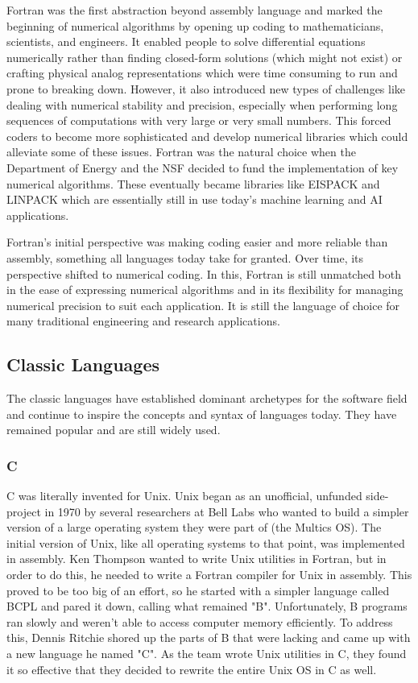 Fortran was the first abstraction beyond assembly language and marked the
beginning of numerical algorithms by opening up coding to mathematicians,
scientists, and engineers. It enabled people to solve differential equations
numerically rather than finding closed-form solutions (which might not exist)
or crafting physical analog representations which were time consuming to run
and prone to breaking down. However, it also introduced new types of challenges
like dealing with numerical stability and precision, especially when performing
long sequences of computations with very large or very small numbers. This
forced coders to become more sophisticated and develop numerical libraries
which could alleviate some of these issues. Fortran was the natural choice when
the Department of Energy and the NSF decided to fund the implementation of key
numerical algorithms. These eventually became libraries like EISPACK and
LINPACK which are essentially still in use today's machine learning and AI
applications.

Fortran's initial perspective was making coding easier and more reliable than
assembly, something all languages today take for granted. Over time, its
perspective shifted to numerical coding. In this, Fortran is still unmatched
both in the ease of expressing numerical algorithms and in its flexibility for
managing numerical precision to suit each application. It is still the language
of choice for many traditional engineering and research applications.

\subsection{Classic Languages}

The classic languages have established dominant archetypes for the software
field and continue to inspire the concepts and syntax of languages today. They
have remained popular and are still widely used.

\subsubsection{C}

C was literally invented for Unix. Unix began as an unofficial, unfunded
side-project in 1970 by several researchers at Bell Labs who wanted to build a
simpler version of a large operating system they were part of (the Multics OS).
The initial version of Unix, like all operating systems to that point, was
implemented in assembly. Ken Thompson wanted to write Unix utilities in
Fortran, but in order to do this, he needed to write a Fortran compiler for
Unix in assembly. This proved to be too big of an effort, so he started with a
simpler language called BCPL and pared it down, calling what remained "B".
Unfortunately, B programs ran slowly and weren't able to access computer memory
efficiently. To address this, Dennis Ritchie shored up the parts of B that were
lacking and came up with a new language he named "C". As the team wrote Unix
utilities in C, they found it so effective that they decided to rewrite the
entire Unix OS in C as well.

